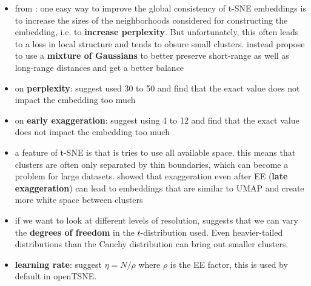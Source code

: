 \begin{itemize}
  \item from \cite{openTSNE}: one easy way to improve the global consistency of t-SNE embeddings is to increase the sizes of the neighborhoods considered for constructing the embedding, i.e. to \textbf{increase perplexity}. But unfortunately, this often leads to a loss in local structure and tends to obsure small clusters. \cite{KoBe19SingleCell} instead propose to use a \textbf{mixture of Gaussians} to better preserve short-range as well as long-range distances and get a better balance 
  \item on \textbf{perplexity}: \cite{belkina19} suggest used 30 to 50 and find that the exact value does not impact the embedding too much
  \item on \textbf{early exaggeration}: \cite{belkina19} suggest using 4 to 12 and find that the exact value does not impact the embedding too much 
  \item a feature of t-SNE is that is tries to use all available space. this means that clusters are often only separated by thin boundaries, which can become a problem for large datasets. \cite{BoehmBerens22} showed that exaggeration even after EE (\textbf{late exaggeration}) can lead to embeddings that are similar to UMAP and create more white space between clusters 
  \item if we want to look at different levels of resolution, \cite{Ko20HeavyTails} suggests that we can vary the \textbf{degrees of freedom} in the $t$-distribution used. Even heavier-tailed distributions than the Cauchy distribution can bring out smaller clusters. 
  \item \textbf{learning rate}: \cite{belkina19} suggest $\eta = N/\rho$ where $\rho$ is the EE factor, this is used by default in openTSNE. 
\end{itemize}

